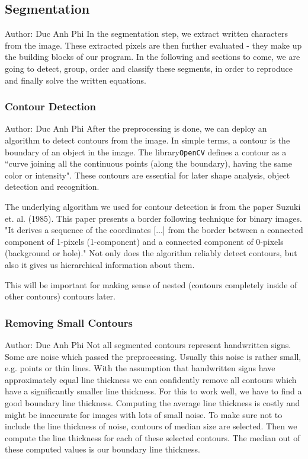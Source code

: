 \documentclass[12pt]{article}
\begin{document}
	
	
	
	\subsection{Segmentation}
		\small{Author: Duc Anh Phi} \newline \newline
	In the segmentation step, we extract written characters from the image.
	These extracted pixels are then further evaluated - they make up the building blocks of our program.
	In the following and sections to come, we are going to detect, group, order and classify these segments, in order to
	reproduce and finally solve the written equations.
	
	\subsubsection{Contour Detection}
	\small{Author: Duc Anh Phi} \newline \newline
	After the preprocessing is done, we can deploy an algorithm to detect contours from the image.
	In simple terms, a contour is the boundary of an object in the image.
	The library\texttt{OpenCV} defines a contour as a ``curve joining all the continuous points (along the boundary), having the same color or intensity".
	These contours are essential for later shape analysis, object detection and recognition.
	
	The underlying algorithm we used for contour detection is from the paper Suzuki et. al. (1985).
	This paper presents a border following technique for binary images. "It derives a sequence of the coordinates [...]
	from the border between a connected component of 1-pixels (1-component) and a connected component of 0-pixels (background or hole)."
	Not only does the algorithm reliably detect contours, but also it gives us hierarchical information about them.
	
	This will be important for making sense of nested (contours completely inside of other contours) contours later.
	
	\subsubsection{Removing Small Contours}
	\small{Author: Duc Anh Phi} \newline \newline
	Not all segmented contours represent handwritten signs.
	Some are noise which passed the preprocessing. Usually this noise is rather small, e.g. points or thin lines.
	With the assumption that handwritten signs have approximately equal line thickness we can confidently remove all contours which have a significantly smaller line thickness.
	For this to work well, we have to find a good boundary line thickness.
	Computing the average line thickness is costly and might be inaccurate for images with lots of small noise.
	To make sure not to include the line thickness of noise, contours of median size are selected. Then we compute the line thickness for each of these selected contours.
	The median out of these computed values is our boundary line thickness.
	
\end{document}

